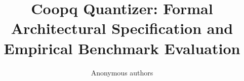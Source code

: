 \title{\textbf{Coopq Quantizer: Formal Architectural Specification and Empirical Benchmark Evaluation}}

\author{Anonymous authors}
